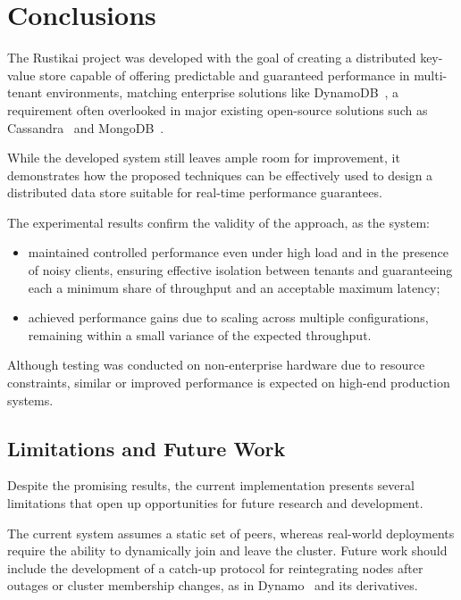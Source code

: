 \section{Conclusions}
\label{sec:conclusions}

The Rustikai project was developed with the goal of creating a distributed key-value store
capable of offering predictable and guaranteed performance in multi-tenant environments,
matching enterprise solutions like DynamoDB~\cite{Dynamo2022},
a requirement often overlooked in major existing open-source solutions such as Cassandra~\cite{Cassandra} and MongoDB~\cite{Mongo}.

While the developed system still leaves ample room for improvement,
it demonstrates how the proposed techniques can be effectively used to design
a distributed data store suitable for real-time performance guarantees.

The experimental results confirm the validity of the approach, as the system:
\begin{itemize}
    \item maintained controlled performance even under high load and in the presence of noisy clients,
    ensuring effective isolation between tenants and guaranteeing each a minimum share of throughput and an acceptable maximum latency;
    \item achieved performance gains due to scaling across multiple configurations, remaining within a small variance of the expected throughput.
\end{itemize}
Although testing was conducted on non-enterprise hardware due to resource constraints,
similar or improved performance is expected on high-end production systems.

\subsection{Limitations and Future Work}
\label{subsec:limitations}

Despite the promising results, the current implementation presents several limitations that open up
opportunities for future research and development.

The current system assumes a static set of peers,
whereas real-world deployments require the ability to dynamically join and leave the cluster.
Future work should include the development of a catch-up protocol for reintegrating nodes after outages or cluster membership changes,
as in Dynamo~\cite{Dynamo2007} and its derivatives.

